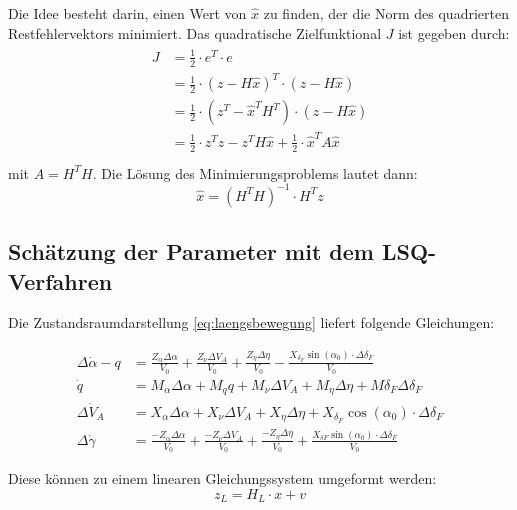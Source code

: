 Die Idee besteht darin, einen Wert von $\hat{x}$ zu finden, der die Norm des quadrierten Restfehlervektors minimiert. Das 
quadratische Zielfunktional $J$ ist gegeben durch: 
\begin{align}
   \begin{split}
     J &= \frac{1}{2} \cdot e^{T} \cdot e \\
     &= \frac{1}{2} \cdot {(z- H\hat{x})}^{T}\cdot(z- H\hat{x}) \\
     &= \frac{1}{2} \cdot (z^{T} -{\hat{x}}^{T}H^{T})\cdot(z- H\hat{x}) \\
     &= \frac{1}{2} \cdot z^{T}z - z^{T}H\hat{x} + \frac{1}{2}\cdot {\hat{x}}^{T}A\hat{x}  \\
   \end{split}
\end{align}
mit $A = H^{T}H$. Die Lösung des Minimierungsproblems lautet dann:
\begin{equation}
    \hat{x}= {(H^{T} H)}^{-1} \cdot H^{T} z 
\end{equation}


\subsection{Schätzung der Parameter mit dem LSQ-Verfahren} 

Die Zustandsraumdarstellung \eqref{eq:laengsbewegung} liefert folgende Gleichungen: 

\begin{align}
	\Delta\dot \alpha-q &=  \frac{Z_{\alpha}\Delta\alpha}{V_0} + \frac{Z_{\nu}\Delta V_{A}}{V_0} + 
	\frac{Z_{\eta}\Delta\eta}{V_0} - \frac{X_{\delta_F}\sin{(\alpha_0)}\cdot\Delta\delta_F}{V_0}\\
	\dot q &= M_{\alpha}\Delta\alpha + M_q q + M_{\nu}\Delta V_A + M_{\eta}\Delta\eta + M{\delta_F}\Delta\delta_F\\
	\Delta\dot V_A &= X_{\alpha}\Delta\alpha +  X_{\nu}\Delta V_A + X_{\eta}\Delta\eta + 
	X_{\delta_F}\cos{(\alpha_0)}\cdot\Delta\delta_F \\
	\Delta \dot \gamma &= \frac{- Z_{\alpha}\Delta\alpha}{V_0} + \frac{- Z_{\nu}\Delta V_{A}}{V_0} + 
	\frac{-Z_{\eta}\Delta\eta}{V_0} + \frac{X_{\delta F}\sin{(\alpha_0)}\cdot\Delta\delta_F}{V_0}
\end{align}
	
Diese können zu einem linearen Gleichungssystem umgeformt werden: 
\begin{equation}
    z_{L}= H_{L}\cdot x + v
\end{equation}

